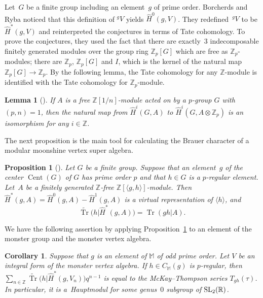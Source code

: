 \documentclass[10pt,a4paper]{amsart}
\numberwithin{equation}{section}
\newtheorem{Corollary}[Theorem]{Corollary}
\newtheorem{Lemma}[Theorem]{Lemma}
\newtheorem{Proposition}[Theorem]{Proposition}
 { \theoremstyle{definition}
\newtheorem{Definition}[Theorem]{Definition}
\newtheorem{Note}[Theorem]{Note}
\newtheorem{Example}[Theorem]{Example}
\newtheorem{Remark}[Theorem]{Remark} }
\begin{document}
Let~$G$ be a finite group including an element~$g$ of prime order. Borcherds and Ryba noticed that this definition of $^gV$ yields $\hat{H}^0(g,V)$. They redefined~$^gV$ to be $\hat{H}^*(g,V)$ and reinterpreted the conjectures in terms of Tate cohomology. To prove the conjectures, they used the fact that there are exactly~3 indecomposable finitely generated modules over the group ring $\mathbb{Z}_p[G]$ which are free as $\mathbb{Z}_p$-modules; there are $\mathbb{Z}_p$, $\mathbb{Z}_p[G]$ and $I$, which is the kernel of the natural map $\mathbb{Z}_p[G]\rightarrow \mathbb{Z}_p$.
By the following lemma, the Tate cohomology for any $\mathbb{Z}$-module is identified with the Tate cohomology for $\mathbb{Z}_p$-module.

\begin{Lemma}[{\cite[Lemma~2.1]{BR}}] \label{Zp}
If $A$ is a free $\mathbb{Z}[1/n]$-module acted on by a $p$-group $G$ with $(p,n)=1$, then the natural map from $\hat{H}^i(G,A)$ to $\hat{H}^i(G,A\otimes \mathbb{Z}_p)$ is an isomorphism for any $i\in \mathbb{Z}$.
\end{Lemma}

The next proposition is the main tool for calculating the Brauer character of a modular moonshine vertex super algebra.

\begin{Proposition}[{\cite[Proposition 2.2]{BR}}]\label{prop2.2}
Let $G$ be a finite group. Suppose that an element~$g$ of the center $\operatorname{Cent}(G)$ of $G$ has prime order $p$ and that $h \in G$ is a $p$-regular element. Let~$A$ be a finitely generated $\mathbb{Z}$-free $\mathbb{Z}[\langle g,h \rangle]$-module. Then $\hat{H}^*(g,A)=\hat{H}^0(g,A)-\hat{H}^1(g,A)$ is a virtual representation of $\langle h \rangle$, and
\[
\widetilde{\operatorname{Tr}}\big(h|\hat{H}^*(g,A)\big)=\operatorname{Tr}(gh|A) .
\]
\end{Proposition}

We have the following assertion by applying Proposition~\ref{prop2.2} to an element of the monster group and the monster vertex algebra.

\begin{Corollary}
Suppose that $g$ is an element of $\mathbb{M}$ of odd prime order. Let $V$ be an integral form of the monster vertex algebra. If $h\in C_{\mathbb{M}}(g)$ is $p$-regular, then $\sum_{n\in \mathbb{Z}}\widetilde{\operatorname{Tr}}\big(h|\hat{H}^*(g,V_n)\big)q^{n-1}$ is equal to the McKay--Thompson series $T_{gh}(\tau)$. In particular, it is a~Hauptmodul for some genus~$0$ subgroup of ${\rm SL}_2(\mathbb{R})$.
\end{Corollary}
\end{document}
